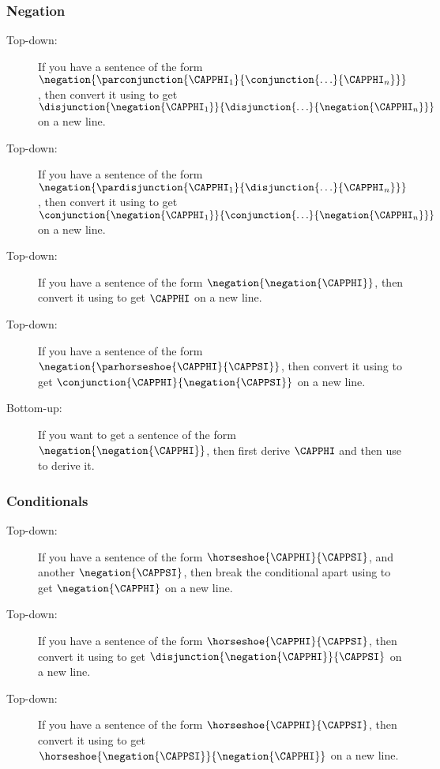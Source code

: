 \subsubsection*{Negation} 
\begin{description}
\item[ Top-down:] If you have a sentence of the form $\negation{\parconjunction{\CAPPHI_1}{\conjunction{\ldots}{\CAPPHI_{\integer{n}}}}}$, then convert it using  to get $\disjunction{\negation{\CAPPHI_1}}{\disjunction{\ldots}{\negation{\CAPPHI_{\integer{n}}}}}$ on a new line.
\item[ Top-down:] If you have a sentence of the form $\negation{\pardisjunction{\CAPPHI_1}{\disjunction{\ldots}{\CAPPHI_{\integer{n}}}}}$, then convert it using  to get $\conjunction{\negation{\CAPPHI_1}}{\conjunction{\ldots}{\negation{\CAPPHI_{\integer{n}}}}}$ on a new line.
\item[ Top-down:] If you have a sentence of the form $\negation{\negation{\CAPPHI}}$, then convert it using  to get $\CAPPHI$ on a new line.
\item[ Top-down:] If you have a sentence of the form $\negation{\parhorseshoe{\CAPPHI}{\CAPPSI}}$, then convert it using  to get $\conjunction{\CAPPHI}{\negation{\CAPPSI}}$ on a new line.
\item[ Bottom-up:] If you want to get a sentence of the form $\negation{\negation{\CAPPHI}}$, then first derive $\CAPPHI$ and then use  to derive it. 
\end{description} 
\subsubsection*{Conditionals} 
\begin{description}
\item[ Top-down:] If you have a sentence of the form $\horseshoe{\CAPPHI}{\CAPPSI}$, and another $\negation{\CAPPSI}$, then break the conditional apart using  to get $\negation{\CAPPHI}$ on a new line.
\item[ Top-down:] If you have a sentence of the form $\horseshoe{\CAPPHI}{\CAPPSI}$, then convert it using  to get $\disjunction{\negation{\CAPPHI}}{\CAPPSI}$ on a new line.
\item[ Top-down:] If you have a sentence of the form $\horseshoe{\CAPPHI}{\CAPPSI}$, then convert it using  to get $\horseshoe{\negation{\CAPPSI}}{\negation{\CAPPHI}}$ on a new line.
\end{description} 
